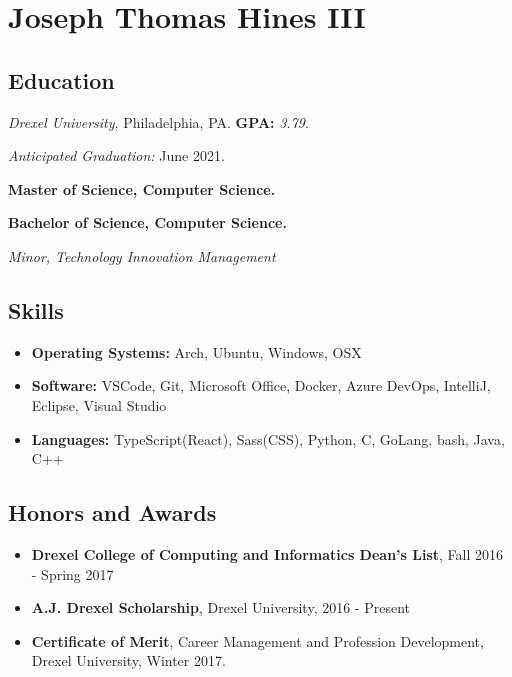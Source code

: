 \documentclass[10pt]{article}
\begin{document}
\section*{\huge Joseph Thomas Hines III}
\label{sec:title}

\begin{multicols}{2}
\subsection*{Education}%
\label{sub:Education}

\emph{Drexel University}, Philadelphia, PA. \textbf{GPA:} \emph{3.79}.

\emph{Anticipated Graduation:} June 2021.

\null

\textbf{Master of Science, Computer Science.}

\textbf{Bachelor of Science, Computer Science.}

\emph{Minor, Technology Innovation Management}

\subsection*{Skills}%
\label{sub:Skills}

\begin{itemize}
\setlength\itemsep{0.5em}
\item \textbf{Operating Systems:} Arch, Ubuntu, Windows, OSX
\item \textbf{Software:} VSCode, Git, Microsoft Office, Docker, Azure DevOps,
	IntelliJ, Eclipse, Visual Studio
\item \textbf{Languages:} TypeScript(React), Sass(CSS), Python, C, GoLang,
	bash, Java, C++
\end{itemize}

\subsection*{Honors and Awards}%
\label{sub:Honors and Awards}

\begin{itemize}
\setlength\itemsep{0.5em}
\item \textbf{Drexel College of Computing and Informatics Dean's List},
	Fall 2016 - Spring 2017
\item \textbf{A.J. Drexel Scholarship}, Drexel University, 2016 - Present
\item \textbf{Certificate of Merit}, Career Management and Profession Development, Drexel University, Winter 2017.
\end{itemize}


\end{multicols}
\end{document}
